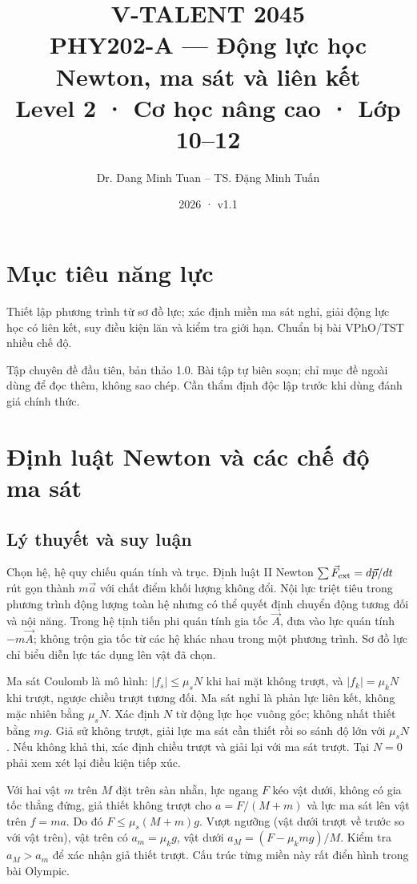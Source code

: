 \documentclass[11pt,a4paper,openany]{book}
\begin{document}
\title{V-TALENT 2045\\ PHY202-A --- Động lực học Newton, ma sát và liên kết\\\large Level 2 · Cơ học nâng cao · Lớp 10–12}
\author{Dr. Dang Minh Tuan -- TS. Đặng Minh Tuấn}
\date{2026 · v1.1}
\maketitle
\tableofcontents
\chapter*{Mục tiêu năng lực}
Thiết lập phương trình từ sơ đồ lực; xác định miền ma sát nghỉ, giải động lực học có liên kết, suy điều kiện lăn và kiểm tra giới hạn. Chuẩn bị bài VPhO/TST nhiều chế độ.

Tập chuyên đề đầu tiên, bản thảo 1.0. Bài tập tự biên soạn; chỉ mục đề ngoài dùng để đọc thêm, không sao chép. Cần thẩm định độc lập trước khi dùng đánh giá chính thức.
\chapter{Định luật Newton và các chế độ ma sát}
\section{Lý thuyết và suy luận}
Chọn hệ, hệ quy chiếu quán tính và trục. Định luật II Newton $\sum\vec F_{\rm ext}=d\vec p/dt$ rút gọn thành $m\vec a$ với chất điểm khối lượng không đổi. Nội lực triệt tiêu trong phương trình động lượng toàn hệ nhưng có thể quyết định chuyển động tương đối và nội năng. Trong hệ tịnh tiến phi quán tính gia tốc $\vec A$, đưa vào lực quán tính $-m\vec A$; không trộn gia tốc từ các hệ khác nhau trong một phương trình. Sơ đồ lực chỉ biểu diễn lực tác dụng lên vật đã chọn.

Ma sát Coulomb là mô hình: $|f_s|\le\mu_s N$ khi hai mặt không trượt, và $|f_k|=\mu_k N$ khi trượt, ngược chiều trượt tương đối. Ma sát nghỉ là phản lực liên kết, không mặc nhiên bằng $\mu_sN$. Xác định $N$ từ động lực học vuông góc; không nhất thiết bằng $mg$. Giả sử không trượt, giải lực ma sát cần thiết rồi so sánh độ lớn với $\mu_sN$. Nếu không khả thi, xác định chiều trượt và giải lại với ma sát trượt. Tại $N=0$ phải xem xét lại điều kiện tiếp xúc.

Với hai vật $m$ trên $M$ đặt trên sàn nhẵn, lực ngang $F$ kéo vật dưới, không có gia tốc thẳng đứng, giả thiết không trượt cho $a=F/(M+m)$ và lực ma sát lên vật trên $f=ma$. Do đó $F\le\mu_s(M+m)g$. Vượt ngưỡng (vật dưới trượt về trước so với vật trên), vật trên có $a_m=\mu_k g$, vật dưới $a_M=(F-\mu_k mg)/M$. Kiểm tra $a_M>a_m$ để xác nhận giả thiết trượt. Cấu trúc từng miền này rất điển hình trong bài Olympic.
\end{document}
